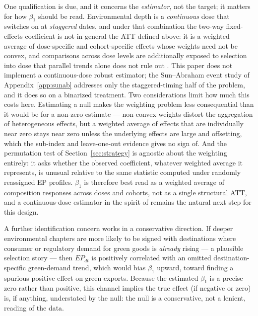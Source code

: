 \documentclass[12pt]{article}
\begin{document}
One qualification is due, and it concerns the \emph{estimator}, not the target; it matters for how $\beta_1$ should be
read. Environmental depth is a \emph{continuous} dose that switches on at
\emph{staggered} dates, and under that combination the two-way fixed-effects coefficient
is not in general the ATT defined above: it is a weighted average of dose-specific and
cohort-specific effects whose weights need not be convex, and comparisons across dose
levels are additionally exposed to selection into dose that parallel trends alone does
not rule out \citep{callaway2024, goodmanbacon2021, dechaisemartin2020}. This paper does
not implement a continuous-dose robust estimator; the Sun--Abraham event study of
Appendix~\ref{app:sunab} addresses only the staggered-timing half of the problem, and it
does so on a binarized treatment. Two considerations limit how much this costs here.
Estimating a null makes the weighting problem less consequential than it would be for a
non-zero estimate --- non-convex weights distort the aggregation of heterogeneous
effects, but a weighted average of effects that are individually near zero stays near
zero unless the underlying effects are large and offsetting, which the sub-index and
leave-one-out evidence gives no sign of. And the permutation test of
Section~\ref{sec:strategy} is agnostic about the weighting entirely: it asks whether the
observed coefficient, whatever weighted average it represents, is unusual relative to the
same statistic computed under randomly reassigned EP profiles. $\beta_1$ is therefore
best read as a weighted average of composition responses across doses and cohorts, not as
a single structural ATT, and a continuous-dose estimator in the spirit of
\citet{callaway2024} remains the natural next step for this design.

A further identification concern works in a conservative direction. If deeper
environmental chapters are more likely to be signed with destinations where consumer or
regulatory demand for green goods is \emph{already} rising --- a plausible selection
story --- then $EP_{dt}$ is positively correlated with an omitted destination-specific
green-demand trend, which would bias $\beta_1$ upward, toward finding a spurious
positive effect on green exports. Because the estimated $\beta_1$ is a precise zero
rather than positive, this channel implies the true effect (if negative or zero) is, if
anything, understated by the null: the null is a conservative, not a lenient, reading of
the data.
\end{document}
